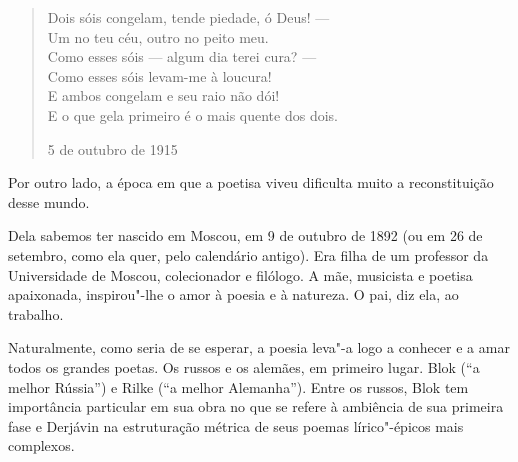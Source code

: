 \begin{verse}
Dois sóis congelam, tende piedade, \qb{}ó Deus! --- \\
Um no teu céu, outro no peito meu. \\[8pt]
Como esses sóis --- algum dia terei cura? --- \\
Como esses sóis levam-me à loucura! \\[8pt]
E ambos congelam e seu raio não dói! \\
E o que gela primeiro é o mais quente dos dois.

5 de outubro de 1915

\end{verse}

Por outro lado, a época em que a poetisa viveu dificulta muito a reconstituição desse mundo.

Dela sabemos ter nascido em Moscou, em 9 de outubro de 1892 (ou
em 26 de setembro, como ela quer, pelo calendário antigo). Era
filha de um professor da Universidade de Moscou, colecionador e
filólogo. A mãe, musicista e poetisa apaixonada, inspirou"-lhe o
amor à poesia e à natureza. O pai, diz ela, ao trabalho.

Naturalmente, como seria de se esperar, a poesia leva"-a logo a
conhecer e a amar todos os grandes poetas. Os russos e os alemães,
em primeiro lugar. Blok (``a melhor Rússia'') e Rilke (``a melhor
Alemanha''). Entre os russos, Blok tem importância particular em
sua obra no que se refere à ambiência de sua primeira fase e
Derjávin na estruturação métrica de seus poemas lírico"-épicos
mais complexos.

